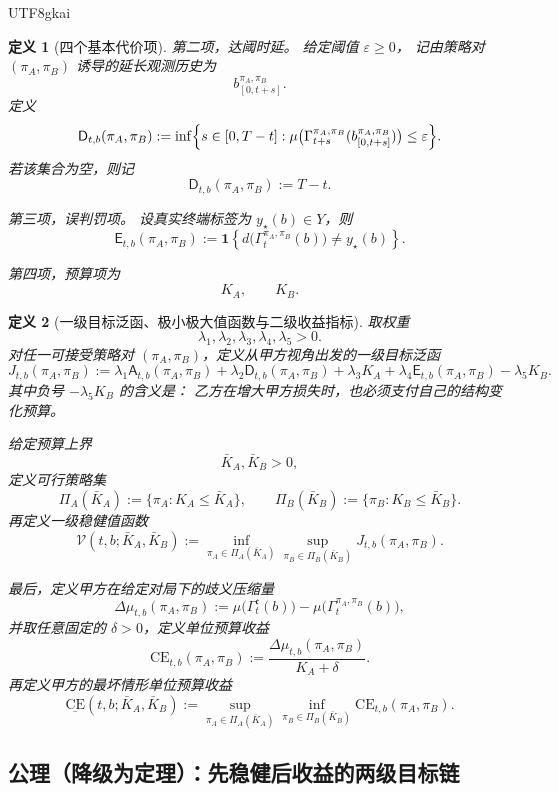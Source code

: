 \documentclass[12pt]{article}
\newtheorem{definition}{定义}[section]
\begin{document}
\begin{CJK*}{UTF8}{gkai}
\begin{definition}[四个基本代价项]
第二项，达阈时延。
给定阈值 $\varepsilon\ge 0$，
记由策略对 $(\pi_A,\pi_B)$ 诱导的延长观测历史为
\[
  b^{\pi_A,\pi_B}_{[0,t+s]}.
\]
定义
\[
  \mathsf D_{t,b}(\pi_A,\pi_B)
  :=
  \inf\Bigl\{
    s\in[0,T-t]:
    \mu\bigl(
      \Gamma_{t+s}^{\pi_A,\pi_B}(b^{\pi_A,\pi_B}_{[0,t+s]})
    \bigr)\le \varepsilon
  \Bigr\}.
\]
若该集合为空，则记
\[
  \mathsf D_{t,b}(\pi_A,\pi_B):=T-t.
\]

第三项，误判罚项。
设真实终端标签为 $y_\star(b)\in Y$，则
\[
  \mathsf E_{t,b}(\pi_A,\pi_B)
  :=
  \mathbf 1\!\left\{
    d\bigl(\Gamma_t^{\pi_A,\pi_B}(b)\bigr)\neq y_\star(b)
  \right\}.
\]

第四项，预算项为
\[
  K_A,\qquad K_B.
\]
\end{definition}

\begin{definition}[一级目标泛函、极小极大值函数与二级收益指标]
\label{def:tex1-ch4-objective}
取权重
\[
  \lambda_1,\lambda_2,\lambda_3,\lambda_4,\lambda_5>0.
\]
对任一可接受策略对 $(\pi_A,\pi_B)$，定义从甲方视角出发的一级目标泛函
\[
  J_{t,b}(\pi_A,\pi_B)
  :=
  \lambda_1 \mathsf A_{t,b}(\pi_A,\pi_B)
  +
  \lambda_2 \mathsf D_{t,b}(\pi_A,\pi_B)
  +
  \lambda_3 K_A
  +
  \lambda_4 \mathsf E_{t,b}(\pi_A,\pi_B)
  -
  \lambda_5 K_B.
\]
其中负号 $-\lambda_5 K_B$ 的含义是：
乙方在增大甲方损失时，也必须支付自己的结构变化预算。

给定预算上界
\[
  \bar K_A,\bar K_B>0,
\]
定义可行策略集
\[
  \Pi_A(\bar K_A)
  :=
  \{\pi_A:K_A\le \bar K_A\},
  \qquad
  \Pi_B(\bar K_B)
  :=
  \{\pi_B:K_B\le \bar K_B\}.
\]
再定义一级稳健值函数
\[
  \mathcal V(t,b;\bar K_A,\bar K_B)
  :=
  \inf_{\pi_A\in\Pi_A(\bar K_A)}
  \sup_{\pi_B\in\Pi_B(\bar K_B)}
  J_{t,b}(\pi_A,\pi_B).
\]

最后，定义甲方在给定对局下的歧义压缩量
\[
  \Delta\mu_{t,b}(\pi_A,\pi_B)
  :=
  \mu\bigl(\Gamma_t^{\mathfrak e}(b)\bigr)
  -
  \mu\bigl(\Gamma_t^{\pi_A,\pi_B}(b)\bigr),
\]
并取任意固定的 $\delta>0$，定义单位预算收益
\[
  \mathrm{CE}_{t,b}(\pi_A,\pi_B)
  :=
  \frac{\Delta\mu_{t,b}(\pi_A,\pi_B)}{K_A+\delta}.
\]
再定义甲方的最坏情形单位预算收益
\[
  \underline{\mathrm{CE}}(t,b;\bar K_A,\bar K_B)
  :=
  \sup_{\pi_A\in\Pi_A(\bar K_A)}
  \inf_{\pi_B\in\Pi_B(\bar K_B)}
  \mathrm{CE}_{t,b}(\pi_A,\pi_B).
\]
\end{definition}

\subsection{公理（降级为定理）：先稳健后收益的两级目标链}
\label{subsec:tex1-ch4-axiom}


\end{CJK*}
\end{document}
